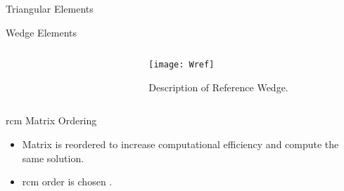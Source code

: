 \begin{frame}{Triangular Elements}
  \begin{figure}
    \centering
    \hspace{0.2in}
    \label{fig:triangle_elements}
  \end{figure}
\end{frame}

\begin{frame}{Wedge Elements}
  \begin{columns}
    \begin{column}{0.5\textwidth}
      \begin{figure}
        \centering
        \hspace{0.1\textwidth}
        \label{fig:sketch_wedge}
      \end{figure}
    \end{column}
    \begin{column}{0.5\textwidth}
      \begin{figure}
        \centering
        \texttt{[image: Wref]}
        \caption{Description of Reference Wedge.}
        \label{fig:Wref}
      \end{figure}
    \end{column}
  \end{columns}
\end{frame}

\begin{frame}{\gls{rcm} Matrix Ordering}
  \begin{itemize}
    \item Matrix is reordered to increase computational efficiency and compute
      the same solution.
    \item \gls{rcm} order is chosen \cite{rcm}.
  \end{itemize}
  \vspace{-0.25in}
  \begin{figure}
    \centering
    \hspace{0.1in}
    \label{fig:sparsity_pattern}
  \end{figure}
\end{frame}

